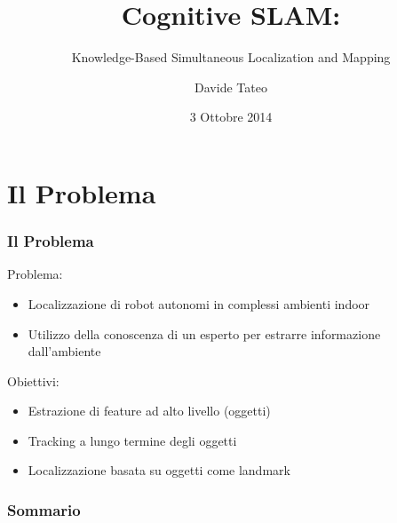 \documentclass[c]{beamer}
\title[Cognitive SLAM]{Cognitive SLAM:}
\subtitle{Knowledge-Based Simultaneous Localization and Mapping}
\author[Davide Tateo]{Davide Tateo}
\date[03/10/2014]{3 Ottobre 2014}
\begin{document}
\polimititlepage[airlab]
\addtocounter{framenumber}{-1}

\section*{Il Problema}
\begin{frame}
\frametitle{Il Problema}

Problema:
\begin{itemize}
 \item Localizzazione di robot autonomi in complessi ambienti indoor
 \item Utilizzo della conoscenza di un esperto per estrarre informazione dall'ambiente
\end{itemize}

Obiettivi:
\begin{itemize}
 \item Estrazione di feature ad alto livello (oggetti)
 \item Tracking a lungo termine degli oggetti
 \item Localizzazione basata su oggetti come landmark 
\end{itemize}

\end{frame}


\begin{frame}
\frametitle{Sommario}
\tableofcontents
\end{frame}

\end{document}
